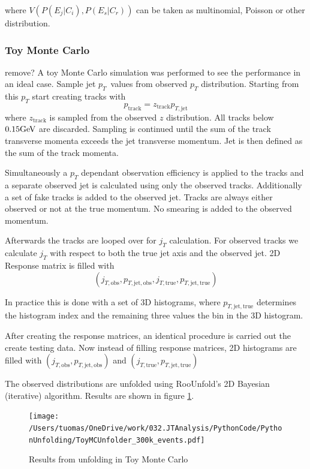  where $V\left(P\left(E_j | C_i\right), P\left(E_s | C_r\right) \right)$ can be taken as multinomial, Poisson or other distribution.
 
\subsubsection{Toy Monte Carlo} 
 {\color{red} remove?}
 A toy Monte Carlo simulation was performed to see the performance in an ideal case.
Sample jet $p_T$ values from observed $p_T$ distribution. Starting from this $p_T$ start creating tracks with 
$$p_{\mathrm{track}} = z_\mathrm{track} p_{T,\mathrm{jet}}$$
where $z_\mathrm{track} $ is sampled from the observed $z$ distribution. All tracks below $0.15\mathrm{GeV}\kern-0.05em$ are discarded. Sampling is continued until the sum of the track transverse momenta exceeds the jet transverse momentum. Jet is then defined as the sum of the track momenta.

Simultaneously a $p_T$ dependant observation efficiency is applied to the tracks and a separate observed jet is calculated using only the observed tracks. Additionally a set of fake tracks is added to the observed jet. Tracks are always either observed or not at the true momentum. No smearing is added to the observed momentum.

Afterwards the tracks are looped over for $j_T$ calculation. For observed tracks we calculate $j_T$ with respect to both the true jet axis and the observed jet. 2D Response matrix is filled with $$\left(j_{T,\mathrm{obs}},p_{T,\mathrm{jet,obs}}, j_{T,\mathrm{true}},p_{T,\mathrm{jet,true}}\right)$$

In practice this is done with a set of 3D histograms, where $p_{T,\mathrm{jet,true}}$ determines the histogram index and the remaining three values the bin in the 3D histogram.

After creating the response matrices, an identical procedure is carried out the create testing data. Now instead of filling response matrices, 2D histograms are filled with $\left(j_{T,\mathrm{obs}},p_{T,\mathrm{jet,obs}}\right)$ and $\left(j_{T,\mathrm{true}},p_{T,\mathrm{jet,true}}\right)$

The observed distributions are unfolded using RooUnfold's 2D Bayesian (iterative) algorithm. Results are shown in figure \ref{fig:toymc}.

\begin{figure}
\centering
\texttt{[image: /Users/tuomas/OneDrive/work/032.JTAnalysis/PythonCode/PythonUnfolding/ToyMCUnfolder\_300k\_events.pdf]}
\caption{Results from unfolding in Toy Monte Carlo}
\label{fig:toymc}
\end{figure}

